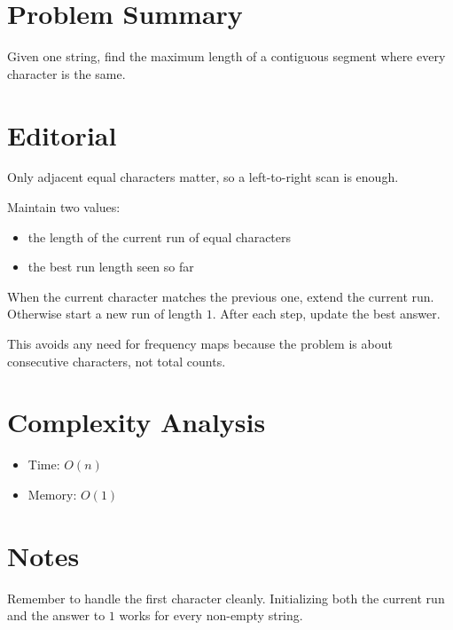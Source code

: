 \section{Problem Summary}
Given one string, find the maximum length of a contiguous segment where every character is the same.

\section{Editorial}
Only adjacent equal characters matter, so a left-to-right scan is enough.

Maintain two values:
\begin{itemize}
\item the length of the current run of equal characters
\item the best run length seen so far
\end{itemize}

When the current character matches the previous one, extend the current run. Otherwise start a new run of length \(1\). After each step, update the best answer.

This avoids any need for frequency maps because the problem is about consecutive characters, not total counts.

\section{Complexity Analysis}
\begin{itemize}
\item Time: \(O(n)\)
\item Memory: \(O(1)\)
\end{itemize}

\section{Notes}
Remember to handle the first character cleanly. Initializing both the current run and the answer to \(1\) works for every non-empty string.

